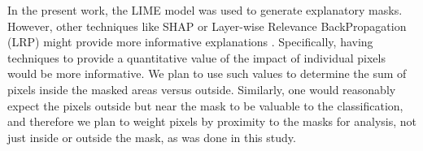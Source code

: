 \documentclass[sn-mathphys,Numbered]{sn-jnl}%
\theoremstyle{thmstyleone}%
\theoremstyle{thmstyletwo}%
\theoremstyle{thmstylethree}%
\begin{document}
In the present work, the LIME model was used to generate explanatory masks.  However, other techniques like SHAP or Layer-wise Relevance BackPropagation (LRP) might provide more informative explanations \cite{SALEEM2022165}.  Specifically, having techniques to provide a quantitative value of the impact of individual pixels would be more informative.  We plan to use such values to determine the sum of pixels inside the masked areas versus outside.  Similarly, one would reasonably expect the pixels outside but near the mask to be valuable to the classification, and therefore we plan to weight pixels by proximity to the masks for analysis, not just inside or outside the mask, as was done in this study.










\end{document}
